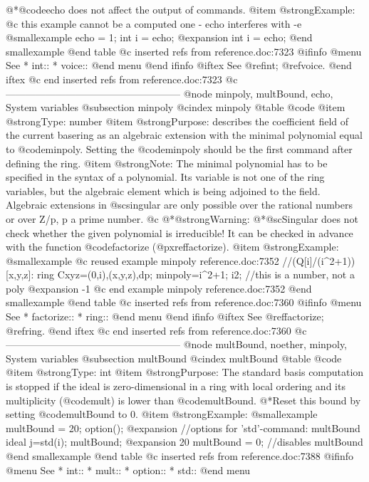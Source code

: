 {{{{{{{{@*@code{echo} does not affect the output of commands.
@item @strong{Example:}
@c this example cannot be a computed one - echo interferes with -e
@smallexample
echo = 1;
int i = echo;
@expansion{} int i = echo;
@end smallexample
@end table
@c inserted refs from reference.doc:7323
@ifinfo
@menu
See
* int::
* voice::
@end menu
@end ifinfo
@iftex
See
@ref{int};
@ref{voice}.
@end iftex
@c end inserted refs from reference.doc:7323
@c -----------------------------------------------------
@node minpoly, multBound, echo, System variables
@subsection minpoly
@cindex minpoly
@table @code
@item @strong{Type:}
number
@item @strong{Purpose:}
describes the coefficient field of the current basering as
an algebraic extension with the minimal polynomial equal to @code{minpoly}.
Setting the @code{minpoly} should be the first command after
defining the ring.
@item @strong{Note:}
The minimal polynomial has to be specified in the syntax of a polynomial.
Its variable is not one of the ring variables, but the algebraic element
which is being adjoined to the field.
Algebraic extensions in @sc{singular} are only possible over the rational
numbers or over Z/p, p a prime number.
@c @*@strong{Warning:}
@*@sc{Singular} does not check whether the given
polynomial is irreducible! It can be checked in advance with the
function @code{factorize} (@pxref{factorize}).
@item @strong{Example:}
@smallexample
@c reused example minpoly reference.doc:7352 
  //(Q[i]/(i^2+1))[x,y,z]:
  ring Cxyz=(0,i),(x,y,z),dp;
  minpoly=i^2+1;
  i2;  //this is a number, not a poly
@expansion{} -1
@c end example minpoly reference.doc:7352
@end smallexample
@end table
@c inserted refs from reference.doc:7360
@ifinfo
@menu
See
* factorize::
* ring::
@end menu
@end ifinfo
@iftex
See
@ref{factorize};
@ref{ring}.
@end iftex
@c end inserted refs from reference.doc:7360
@c -----------------------------------------------------
@node multBound, noether, minpoly, System variables
@subsection multBound
@cindex multBound
@table @code
@item @strong{Type:}
int
@item @strong{Purpose:}
The standard basis computation is stopped if the ideal is
zero-dimensional in a ring with local ordering
and its multiplicity (@code{mult}) is lower than @code{multBound}.
@*Reset this bound by setting @code{multBound} to 0.
@item @strong{Example:}
@smallexample
multBound = 20;
option();
@expansion{}    //options for 'std'-command: multBound
ideal j=std(i);
multBound;
@expansion{} 20
multBound = 0;  //disables multBound
@end smallexample
@end table
@c inserted refs from reference.doc:7388
@ifinfo
@menu
See
* int::
* mult::
* option::
* std::
@end menu
}}}}}}}}
